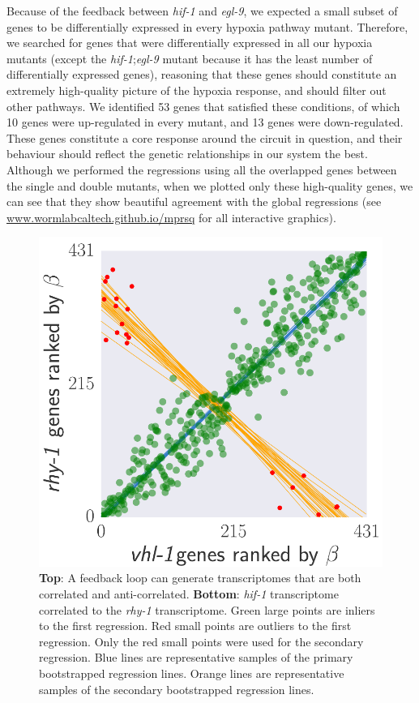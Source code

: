 \documentclass[9pt,twocolumn,twoside]{pnas-new}
\newcommand{\egl}{\emph{egl-9}}
\newcommand{\rhy}{\emph{rhy-1}}
\newcommand{\hif}{\emph{hif-1}}
\newcommand{\inall}{53}
\newcommand{\allup}{10}
\newcommand{\alldown}{13}
\begin{document}
Because of the feedback between \hif{} and \egl{}, we expected a small subset of
genes to be differentially expressed in every hypoxia pathway mutant.
Therefore, we searched for genes that were differentially expressed in all our
hypoxia mutants (except the \hif{};\egl{} mutant because it has the least number
of differentially expressed genes), reasoning that these genes should constitute
an extremely high-quality picture of the hypoxia response, and should filter out other
pathways.
We identified \inall{} genes that satisfied these conditions, of which \allup{}
genes were up-regulated in every mutant, and \alldown{} genes were down-regulated.
These genes constitute a core response around the
circuit in question, and their behaviour should reflect the genetic relationships
in our system the best. Although we performed the regressions using all the
overlapped genes between the single and double mutants, when we plotted only
these high-quality genes, we can see that they show beautiful agreement with the
global regressions (see \url{www.wormlabcaltech.github.io/mprsq} for all
interactive graphics).

\begin{figure}[tbhp]
\centering
\includegraphics[width=\linewidth]{figs/correlative_genetics2.pdf}
\caption{
\textbf{Top}: A feedback loop can generate transcriptomes that are both
correlated and anti-correlated. \textbf{Bottom}: \hif{} transcriptome correlated
to the \rhy{} transcriptome. Green large points are inliers to the first
regression. Red small points are outliers to the first regression. Only the red
small points were used for the secondary regression. Blue lines are representative
samples of the primary bootstrapped regression lines. Orange lines are
representative samples of the secondary bootstrapped regression lines.
}
\label{fig:xpattern}
\end{figure}
\end{document}
